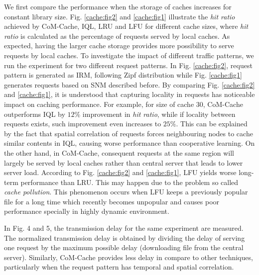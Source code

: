 \documentclass[journal,onecolumn]{IEEEtran}
\begin{document}
We first compare the performance when the storage of caches increases for constant library size. Fig. \ref{cache:fig2} and \ref{cache:fig1} illustrate the \textit{hit ratio} achieved by CoM-Cache, IQL, LRU and LFU for different cache sizes, where \textit{hit ratio} is calculated as the percentage of requests served by local caches.
As expected, having the larger cache storage provides more possibility to serve requests by local caches.  
To investigate the impact of different traffic patterns, we run the experiment for two different request patterns. In Fig. \ref{cache:fig2}, request pattern is generated as IRM, following Zipf distribution while Fig. \ref{cache:fig1} generates requests based on SNM described before. By comparing Fig. \ref{cache:fig2} and \ref{cache:fig1}, it is understood that capturing locality in requests has noticeable impact on caching performance. For example, for size of cache $30$, CoM-Cache outperforms IQL by $12\%$ improvement in \textit{hit ratio}, while if locality between requests exists, such improvement even increases to $25\%$. This can be explained by the fact that spatial correlation of requests forces neighbouring nodes to cache similar contents in IQL, causing worse performance than cooperative learning. On the other hand, in CoM-Cache, consequent requests at the same region will largely be served by local caches rather than central server that leads to lower server load.
According to Fig. \ref{cache:fig2} and \ref{cache:fig1}, LFU yields worse long-term performance than LRU. This may happen due to the problem so called \textit{cache pollution}. This phenomenon occurs when LFU keeps a previously popular file for a long time which recently becomes unpopular and causes poor performance specially in highly dynamic environment.

In Fig. 4 and 5, the transmission delay for the same experiment are measured. The normalized transmission delay is obtained by dividing the delay of serving one request by the maximum possible delay (downloading file from the central server). Similarly, CoM-Cache provides less delay in compare to other techniques, particularly when the request pattern has temporal and spatial correlation.


%
%
%
\end{document}
